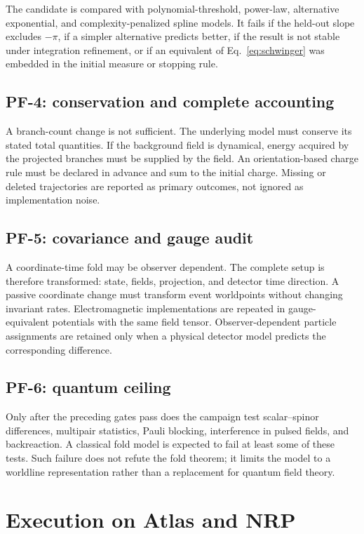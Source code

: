 \documentclass[aps,prd,reprint,nofootinbib,longbibliography]{revtex4-2}
\begin{document}
The candidate is compared with polynomial-threshold, power-law, alternative
exponential, and complexity-penalized spline models.  It fails if the held-out slope
excludes $-\pi$, if a simpler alternative predicts better, if the result is not
stable under integration refinement, or if an equivalent of Eq.~\eqref{eq:schwinger}
was embedded in the initial measure or stopping rule.

\subsection{PF-4: conservation and complete accounting}

A branch-count change is not sufficient.  The underlying model must conserve its
stated total quantities.  If the background field is dynamical, energy acquired by
the projected branches must be supplied by the field.  An orientation-based charge
rule must be declared in advance and sum to the initial charge.  Missing or deleted
trajectories are reported as primary outcomes, not ignored as implementation noise.

\subsection{PF-5: covariance and gauge audit}

A coordinate-time fold may be observer dependent.  The complete setup is therefore
transformed: state, fields, projection, and detector time direction.  A passive
coordinate change must transform event worldpoints without changing invariant
rates.  Electromagnetic implementations are repeated in gauge-equivalent potentials
with the same field tensor.  Observer-dependent particle assignments are retained
only when a physical detector model predicts the corresponding difference.

\subsection{PF-6: quantum ceiling}

Only after the preceding gates pass does the campaign test scalar--spinor
differences, multipair statistics, Pauli blocking, interference in pulsed fields,
and backreaction.  A classical fold model is expected to fail at least some of
these tests.  Such failure does not refute the fold theorem; it limits the model to
a worldline representation rather than a replacement for quantum field theory.

\section{Execution on Atlas and NRP}
\end{document}

